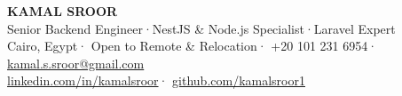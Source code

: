 \documentclass[10pt, a4paper]{article}
\begin{document}
\colorbox{BgHdr}{%
  \begin{minipage}{\dimexpr\linewidth-2\fboxsep\relax}
    \vspace{8pt}
    \begin{center}
      {\huge\bfseries\color{Dark} KAMAL SROOR}\\[4pt]
      {\large\color{Blue} Senior Backend Engineer\enspace·\enspace NestJS \& Node.js Specialist\enspace·\enspace Laravel Expert}\\[5pt]
      {\small\color{Mid}
        Cairo, Egypt\enspace·\enspace
        Open to Remote \& Relocation\enspace·\enspace
        +20 101 231 6954\enspace·\enspace
        \href{mailto:kamal.s.sroor@gmail.com}{kamal.s.sroor@gmail.com}\\[2pt]
        \href{https://www.linkedin.com/in/kamalsroor}{linkedin.com/in/kamalsroor}\enspace·\enspace
        \href{https://github.com/kamalsroor1}{github.com/kamalsroor1}
      }
    \end{center}
    \vspace{6pt}
  \end{minipage}%
}

\vspace{10pt}
\end{document}
